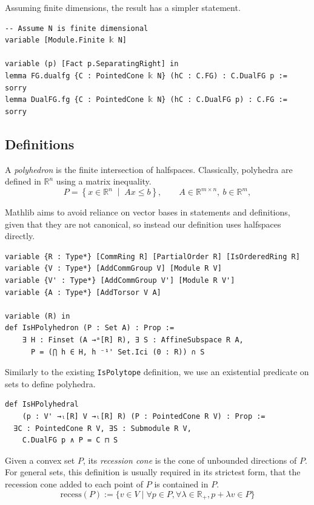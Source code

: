 Assuming finite dimensions, the result has a simpler statement.
\begin{lstlisting}
-- Assume N is finite dimensional
variable [Module.Finite 𝕜 N]

variable (p) [Fact p.SeparatingRight] in
lemma FG.dualfg {C : PointedCone 𝕜 N} (hC : C.FG) : C.DualFG p := sorry
lemma DualFG.fg {C : PointedCone 𝕜 N} (hC : C.DualFG p) : C.FG := sorry
\end{lstlisting}

\subsection{Definitions}
\label{subsec:mw:definitions}

A \emph{polyhedron} is the finite intersection of halfspaces.
Classically, polyhedra are defined in $\mathbb{R}^n$ using a matrix inequality.
\[
  P = \left\{ x \in \mathbb{R}^n \;\middle|\; A x \le b \right\},
  \qquad A \in \mathbb{R}^{m \times n},\ b \in \mathbb{R}^m,
\]

Mathlib aims to avoid reliance on vector bases in statements and definitions,
given that they are not canonical, so instead our definition uses halfspaces
directly.

\begin{lstlisting}
variable {R : Type*} [CommRing R] [PartialOrder R] [IsOrderedRing R]
variable {V : Type*} [AddCommGroup V] [Module R V]
variable {V' : Type*} [AddCommGroup V'] [Module R V']
variable {A : Type*} [AddTorsor V A]

variable (R) in
def IsHPolyhedron (P : Set A) : Prop :=
    ∃ H : Finset (A →ᵃ[R] R), ∃ S : AffineSubspace R A,
      P = (⋂ h ∈ H, h ⁻¹' Set.Ici (0 : R)) ∩ S
\end{lstlisting}

Similarly to the existing \texttt{IsPolytope} definition, we use an existential
predicate on sets to define polyhedra.

\begin{lstlisting}
def IsHPolyhedral
    (p : V' →ₗ[R] V →ₗ[R] R) (P : PointedCone R V) : Prop :=
  ∃C : PointedCone R V, ∃S : Submodule R V,
    C.DualFG p ∧ P = C ⊓ S
\end{lstlisting}

Given a convex set $P$, its \emph{recession cone} is the cone of unbounded
directions of $P$.
For general sets, this definition is usually required in its strictest form,
that the recession cone added to each point of $P$ is contained in $P$.
\[
  \text{recess}(P) := \{ v \in V \mid
    \forall p \in P, \forall \lambda \in \mathbb{R}_+,
      p + \lambda v \in P \}
\]

